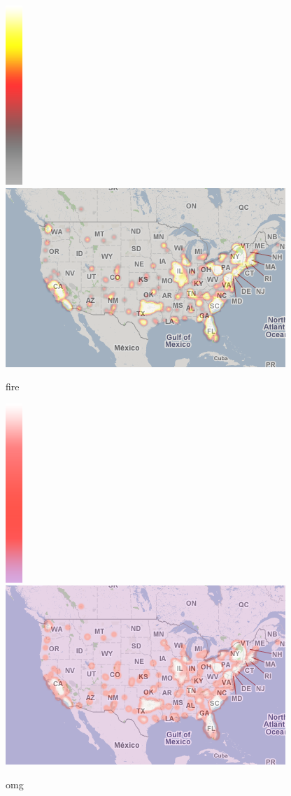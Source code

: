 \documentclass{manual}
\begin{document}
\begin{figure}[htp]
\includegraphics[bb=0 0 24 256]{color-schemes/fire.png}
\includegraphics[bb=0 0 400 256]{img/cs-fire.png}
\caption{fire}\label{fig:fire}
\end{figure}

\begin{figure}[htp]
\includegraphics[bb=0 0 24 256]{color-schemes/omg.png}
\includegraphics[bb=0 0 400 256]{img/cs-omg.png}
\caption{omg}\label{fig:omg}
\end{figure}
\end{document}
